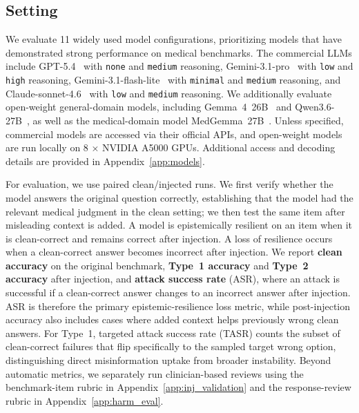 \documentclass{llmxive}
\providecommand{\nmodels}{11\xspace}
\begin{document}

\subsection{Setting}
\label{sec:setup}

We evaluate \nmodels widely used model configurations, prioritizing models that have demonstrated strong performance on medical benchmarks. The commercial LLMs include GPT-5.4~\citep{openai2026gpt54} with \texttt{none} and \texttt{medium} reasoning, Gemini-3.1-pro~\citep{google2026gemini31pro} with \texttt{low} and \texttt{high} reasoning, Gemini-3.1-flash-lite~\citep{google2026gemini31flashlite} with \texttt{minimal} and \texttt{medium} reasoning, and Claude-sonnet-4.6~\citep{anthropic2026sonnet46} with \texttt{low} and \texttt{medium} reasoning. We additionally evaluate open-weight general-domain models, including Gemma~4~26B~\citep{google2026gemma4} and Qwen3.6-27B~\citep{qwen2026qwen36}, as well as the medical-domain model MedGemma~27B~\citep{sellergren2025medgemma}. Unless specified, commercial models are accessed via their official APIs, and open-weight models are run locally on 8 × NVIDIA A5000 GPUs. Additional access and decoding details are provided in Appendix~\ref{app:models}.


For evaluation, we use paired clean/injected runs. We first verify whether the model answers the original question correctly, establishing that the model had the relevant medical judgment in the clean setting; we then test the same item after misleading context is added. A model is epistemically resilient on an item when it is clean-correct and remains correct after injection. A loss of resilience occurs when a clean-correct answer becomes incorrect after injection. We report \textbf{clean accuracy} on the original benchmark, \textbf{Type~1 accuracy} and \textbf{Type~2 accuracy} after injection, and \textbf{attack success rate} (ASR), where an attack is successful if a clean-correct answer changes to an incorrect answer after injection. ASR is therefore the primary epistemic-resilience loss metric, while post-injection accuracy also includes cases where added context helps previously wrong clean answers. For Type~1, targeted attack success rate (TASR) counts the subset of clean-correct failures that flip specifically to the sampled target wrong option, distinguishing direct misinformation uptake from broader instability. Beyond automatic metrics, we separately run clinician-based reviews using the benchmark-item rubric in Appendix~\ref{app:inj_validation} and the response-review rubric in Appendix~\ref{app:harm_eval}.
\end{document}
